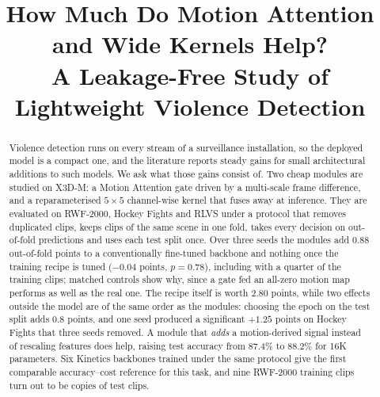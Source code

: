 \documentclass[conference]{IEEEtran}
\begin{document}
\title{How Much Do Motion Attention and Wide Kernels Help?\\
A Leakage-Free Study of Lightweight Violence Detection}

\author{
\and
{}
}

\maketitle

\begin{abstract}
Violence detection runs on every stream of a surveillance installation, so
the deployed model is a compact one, and the literature reports steady
gains for small architectural additions to such models. We ask what those
gains consist of. Two cheap modules are studied on X3D-M: a Motion
Attention gate driven by a multi-scale frame difference, and a
reparameterised $5\times5$ channel-wise kernel that fuses away at
inference. They are evaluated on RWF-2000, Hockey Fights and RLVS under a
protocol that removes duplicated clips, keeps clips of the same scene in
one fold, takes every decision on out-of-fold predictions and uses each
test split once. Over three seeds the modules add 0.88 out-of-fold points
to a conventionally fine-tuned backbone and nothing once the training
recipe is tuned ($-0.04$ points, $p=0.78$), including with a quarter of
the training clips; matched controls show why, since a gate fed an
all-zero motion map performs as well as the real one. The recipe itself is
worth 2.80 points, while two effects outside the model are of the same
order as the modules: choosing the epoch on the test split adds 0.8 points,
and one seed produced a significant $+1.25$ points on Hockey Fights that
three seeds removed. A module that \emph{adds} a motion-derived signal
instead of rescaling features does help, raising test accuracy from 87.4\%
to 88.2\% for 16K parameters. Six Kinetics backbones trained under the same
protocol give the first comparable accuracy--cost reference for this task,
and nine RWF-2000 training clips turn out to be copies of test clips.
\end{abstract}
\end{document}
